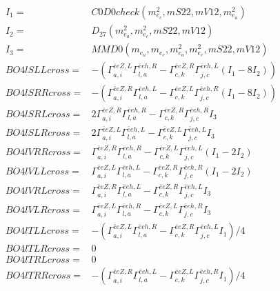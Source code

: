 \documentclass[A4,landscape]{article}
\begin{document}
\begin{align} 
I_1 = & C0D0check(m^2_{e_{{c}}}, mS22, mV12, m^2_{e_{{a}}}) \\ 
I_2 = & D_{27}(m^2_{e_{{a}}}, m^2_{e_{{c}}}, mS22, mV12) \\ 
I_3 = & MMD0(m_{e_{{a}}}, m_{e_{{c}}}, m^2_{e_{{a}}}, m^2_{e_{{c}}}, mS22, mV12) \\ 
  BO4lSLLcross= & -( \Gamma^{\bar{e}e Z ,L}_{a, i} \Gamma^{\bar{e}e h ,R}_{l, a} - \Gamma^{\bar{e}e Z ,R} _{c, k} \Gamma^{\bar{e}e h ,L}_{j, c} (I_1 - 8 I_2)) \\ 
  BO4lSRRcross= & -( \Gamma^{\bar{e}e Z ,R}_{a, i} \Gamma^{\bar{e}e h ,L}_{l, a} - \Gamma^{\bar{e}e Z ,L} _{c, k} \Gamma^{\bar{e}e h ,R}_{j, c} (I_1 - 8 I_2)) \\ 
  BO4lSRLcross= & 2  \Gamma^{\bar{e}e Z ,R}_{a, i} \Gamma^{\bar{e}e h ,R}_{l, a} - \Gamma^{\bar{e}e Z ,R} _{c, k} \Gamma^{\bar{e}e h ,R}_{j, c} I_3 \\ 
  BO4lSLRcross= & 2  \Gamma^{\bar{e}e Z ,L}_{a, i} \Gamma^{\bar{e}e h ,L}_{l, a} - \Gamma^{\bar{e}e Z ,L} _{c, k} \Gamma^{\bar{e}e h ,L}_{j, c} I_3 \\ 
  BO4lVRRcross= &  \Gamma^{\bar{e}e Z ,R}_{a, i} \Gamma^{\bar{e}e h ,R}_{l, a} - \Gamma^{\bar{e}e Z ,L} _{c, k} \Gamma^{\bar{e}e h ,L}_{j, c} (I_1 - 2 I_2) \\ 
  BO4lVLLcross= &  \Gamma^{\bar{e}e Z ,L}_{a, i} \Gamma^{\bar{e}e h ,L}_{l, a} - \Gamma^{\bar{e}e Z ,R} _{c, k} \Gamma^{\bar{e}e h ,R}_{j, c} (I_1 - 2 I_2) \\ 
  BO4lVRLcross= &  \Gamma^{\bar{e}e Z ,R}_{a, i} \Gamma^{\bar{e}e h ,L}_{l, a} - \Gamma^{\bar{e}e Z ,R} _{c, k} \Gamma^{\bar{e}e h ,L}_{j, c} I_3 \\ 
  BO4lVLRcross= &  \Gamma^{\bar{e}e Z ,L}_{a, i} \Gamma^{\bar{e}e h ,R}_{l, a} - \Gamma^{\bar{e}e Z ,L} _{c, k} \Gamma^{\bar{e}e h ,R}_{j, c} I_3 \\ 
  BO4lTLLcross= & -( \Gamma^{\bar{e}e Z ,L}_{a, i} \Gamma^{\bar{e}e h ,R}_{l, a} - \Gamma^{\bar{e}e Z ,R} _{c, k} \Gamma^{\bar{e}e h ,L}_{j, c} I_1)/4 \\ 
  BO4lTLRcross= & 0 \\ 
  BO4lTRLcross= & 0 \\ 
  BO4lTRRcross= & -( \Gamma^{\bar{e}e Z ,R}_{a, i} \Gamma^{\bar{e}e h ,L}_{l, a} - \Gamma^{\bar{e}e Z ,L} _{c, k} \Gamma^{\bar{e}e h ,R}_{j, c} I_1)/4 \\ 
\end{align} 
\end{document}
